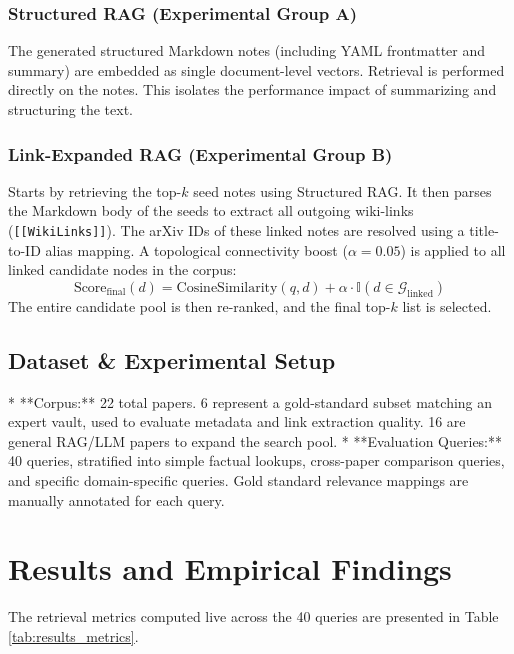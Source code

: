 \documentclass[11pt, a4paper, oneside]{article}
\begin{document}
\subsubsection{Structured RAG (Experimental Group A)}
The generated structured Markdown notes (including YAML frontmatter and summary) are embedded as single document-level vectors. Retrieval is performed directly on the notes. This isolates the performance impact of summarizing and structuring the text.

\subsubsection{Link-Expanded RAG (Experimental Group B)}
Starts by retrieving the top-$k$ seed notes using Structured RAG. It then parses the Markdown body of the seeds to extract all outgoing wiki-links (\texttt{[[WikiLinks]]}). The arXiv IDs of these linked notes are resolved using a title-to-ID alias mapping. A topological connectivity boost ($\alpha = 0.05$) is applied to all linked candidate nodes in the corpus:
\begin{equation}
    \text{Score}_{\text{final}}(d) = \text{CosineSimilarity}(q, d) + \alpha \cdot \mathbb{I}(d \in \mathcal{G}_{\text{linked}})
\end{equation}
The entire candidate pool is then re-ranked, and the final top-$k$ list is selected.

\subsection{Dataset & Experimental Setup}
* **Corpus:** 22 total papers. 6 represent a gold-standard subset matching an expert vault, used to evaluate metadata and link extraction quality. 16 are general RAG/LLM papers to expand the search pool.
* **Evaluation Queries:** 40 queries, stratified into simple factual lookups, cross-paper comparison queries, and specific domain-specific queries. Gold standard relevance mappings are manually annotated for each query.

\section{Results and Empirical Findings}
\label{sec:results}

The retrieval metrics computed live across the 40 queries are presented in Table \ref{tab:results_metrics}.
\end{document}
